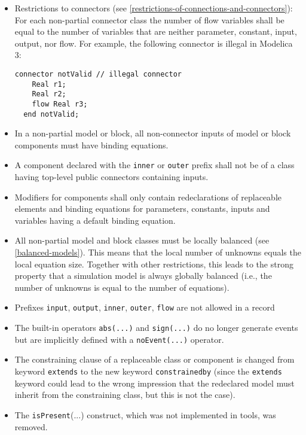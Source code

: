 \begin{itemize}
\item
  Restrictions to connectors (see \autoref{restrictions-of-connections-and-connectors}): For each non-partial
  connector class the number of flow variables shall be equal to the
  number of variables that are neither parameter, constant, input,
  output, nor flow. For example, the following connector is illegal in
  Modelica 3:
  \begin{lstlisting}[language=modelica]
  connector notValid // illegal connector
    Real r1;
    Real r2;
    flow Real r3;
  end notValid;
  \end{lstlisting}
\item
  In a non-partial model or block, all non-connector inputs of model or
  block components must have binding equations.
\item
  A component declared with the \lstinline!inner! or \lstinline!outer! prefix shall not be of a
  class having top-level public connectors containing inputs.
\item
  Modifiers for components shall only contain redeclarations of
  replaceable elements and binding equations for parameters, constants,
  inputs and variables having a default binding equation.
\item
  All non-partial model and block classes must be locally balanced (see
  \autoref{balanced-models}). This means that the local number of unknowns equals the
  local equation size. Together with other restrictions, this leads to
  the strong property that a simulation model is always globally
  balanced (i.e., the number of unknowns is equal to the number of
  equations).
\item
  Prefixes \lstinline!input!, \lstinline!output!, \lstinline!inner!, \lstinline!outer!,
	\lstinline!flow! are not allowed in a record
\item
  The built-in operators \lstinline!abs(...)! and \lstinline!sign(...)! do no longer
  generate events but are implicitly defined with a \lstinline!noEvent(...)!
  operator.
\item
  The constraining clause of a replaceable class or component is changed
  from keyword \lstinline!extends! to the new keyword \lstinline!constrainedby! (since the
  \lstinline!extends! keyword could lead to the wrong impression that the redeclared
  model must inherit from the constraining class, but this is not the
  case).
\item
  The \lstinline!isPresent!(...) construct, which was not implemented in tools, was
  removed.
\end{itemize}

